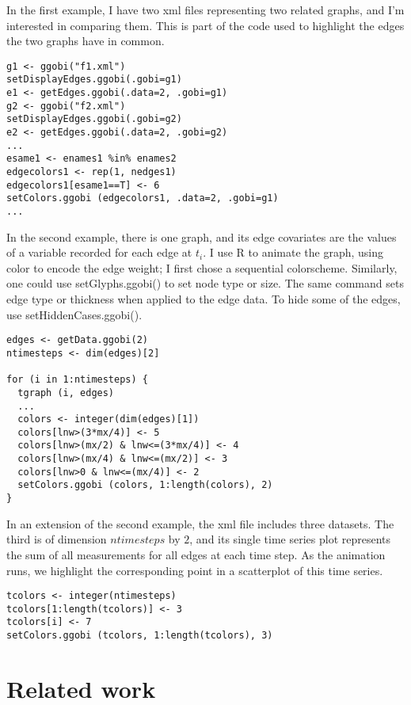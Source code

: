 \documentclass[11pt]{article}
\begin{document}
In the first example, I have two xml files representing two
related graphs, and I'm interested in comparing them.  This is
part of the code used to highlight the edges the two graphs
have in common.

\begin{verbatim}
g1 <- ggobi("f1.xml")
setDisplayEdges.ggobi(.gobi=g1)
e1 <- getEdges.ggobi(.data=2, .gobi=g1)
g2 <- ggobi("f2.xml")
setDisplayEdges.ggobi(.gobi=g2)
e2 <- getEdges.ggobi(.data=2, .gobi=g2)
...
esame1 <- enames1 %in% enames2
edgecolors1 <- rep(1, nedges1)
edgecolors1[esame1==T] <- 6
setColors.ggobi (edgecolors1, .data=2, .gobi=g1)
...
\end{verbatim}


In the second example, there is one graph, and its edge covariates are
the values of a variable recorded for each edge at $t_i$.  I use R to
animate the graph, using color to encode the edge weight; I first chose
a sequential colorscheme.  Similarly, one could use setGlyphs.ggobi() to
set node type or size.  The same command sets edge type or thickness
when applied to the edge data.  To hide some of the edges, use
setHiddenCases.ggobi().

\begin{verbatim}
edges <- getData.ggobi(2)
ntimesteps <- dim(edges)[2]

for (i in 1:ntimesteps) {
  tgraph (i, edges)
  ...
  colors <- integer(dim(edges)[1])
  colors[lnw>(3*mx/4)] <- 5
  colors[lnw>(mx/2) & lnw<=(3*mx/4)] <- 4
  colors[lnw>(mx/4) & lnw<=(mx/2)] <- 3
  colors[lnw>0 & lnw<=(mx/4)] <- 2
  setColors.ggobi (colors, 1:length(colors), 2)
}
\end{verbatim}

In an extension of the second example, the xml file includes three
datasets.  The third is of dimension $ntimesteps$ by $2$, and its
single time series plot represents the sum of all measurements
for all edges at each time step.  As the animation runs,
we highlight the corresponding point in a scatterplot of this time series.

\begin{verbatim}
tcolors <- integer(ntimesteps)
tcolors[1:length(tcolors)] <- 3
tcolors[i] <- 7
setColors.ggobi (tcolors, 1:length(tcolors), 3)
\end{verbatim}

\section{Related work}
\end{document}
